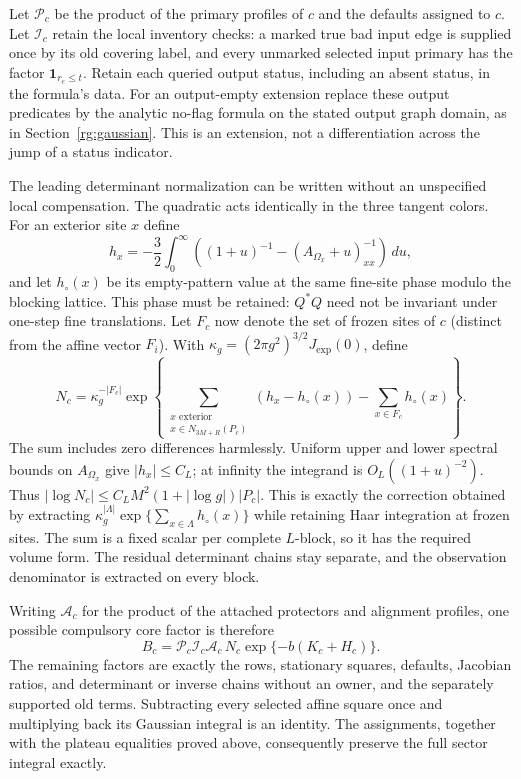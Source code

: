 Let $\mathcal P_c$ be the product of the primary profiles of $c$ and
the defaults assigned to $c$.  Let $\mathcal I_c$ retain the local
inventory checks: a marked true bad input edge is supplied once by its
old covering label, and every unmarked selected input primary has the
factor $\mathbf1_{r_e\le t}$.  Retain each queried output status,
including an absent status, in the formula's data.  For an output-empty
extension replace these output predicates by the analytic no-flag
formula on the stated output graph domain, as in Section~\ref{rg:gaussian}.
This is an extension, not a differentiation across the jump of a status
indicator.

The leading determinant normalization can be written without an
unspecified local compensation.  The quadratic acts identically in the
three tangent colors.  For an exterior site $x$ define
\[
 h_x=-\frac32\int_0^\infty
       \left((1+u)^{-1}-(A_{\Omega_x}+u)^{-1}_{xx}\right)\,du,
\]
and let $h_\circ(x)$ be its empty-pattern value at the same fine-site
phase modulo the blocking lattice.  This phase must be retained:
$Q^*Q$ need not be invariant under one-step fine translations.
Let $F_c$ now denote
the set of frozen sites of $c$ (distinct from the affine vector $F_i$).
With $\kappa_g=(2\pi g^2)^{3/2}J_{\exp}(0)$, define
\[
 N_c=\kappa_g^{-|F_c|}
 \exp\left\{\sum_{\substack{x\text{ exterior}\\
                    x\in N_{3M+R}(P_c)}}(h_x-h_\circ(x))
                    -\sum_{x\in F_c}h_\circ(x)\right\}.
\]
The sum includes zero differences harmlessly.  Uniform upper and lower
spectral bounds on $A_{\Omega_x}$ give $|h_x|\le C_L$; at infinity
the integrand is $O_L((1+u)^{-2})$.  Thus
$|\log N_c|\le C_LM^2(1+|\log g|)|P_c|$.
This is exactly the correction obtained by extracting
$\kappa_g^{|\Lambda|}\exp\{\sum_{x\in\Lambda}h_\circ(x)\}$
while retaining Haar integration at frozen sites.  The sum is a fixed
scalar per complete $L$-block, so it has the required volume form.
The residual determinant chains stay
separate, and the observation denominator is extracted on every block.

Writing $\mathcal A_c$ for the product of the attached protectors and
alignment profiles, one possible compulsory core factor is therefore
\begin{equation}
 B_c=\mathcal P_c\mathcal I_c\mathcal A_c\,N_c
                 \exp\{-b(K_c+H_c)\}.
 \label{app:explicit-core}
\end{equation}
The remaining factors are exactly the rows, stationary squares,
defaults, Jacobian ratios, and determinant or inverse chains without an
owner, and the separately supported old terms.  Subtracting every
selected affine square once and multiplying back its Gaussian integral
is an identity.  The assignments, together with the plateau equalities
proved above, consequently preserve the full sector integral exactly.

